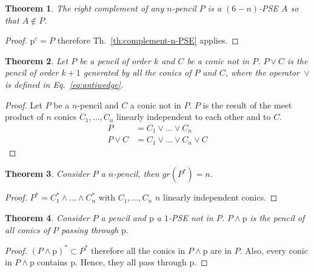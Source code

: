 \documentclass{birkjour}
\newtheorem{theorem}{Theorem}
\begin{document}
\begin{theorem}
The right complement of any \(n\)-pencil \(P\) is a \((6-n)\)-PSE \(A\) so that \(A \notin P\).
\end{theorem}
\begin{proof}
\(\mathrm{p}^c = P\) therefore Th.~\ref{th:complement-n-PSE} applies.
\end{proof}


\begin{theorem} \label{th:constraint-add-conic}
Let \(P\) be a pencil of order \(k\) and \(C\) be a conic not in \(P\).
    \(P\vee C\) is the pencil of order $k+1$ generated by all the conics of \(P\) and \(C\), where the operator~$\vee$ is defined in Eq.~\eqref{eq:antiwedge}.
\end{theorem}


\begin{proof}
Let \(P\) be a \(n\)-pencil and \(C\) a conic not in \(P\). 
\(P\) is the result of the meet product of \(n\) conics \(C_1, \dots, C_n\) linearly independent to each other and to \(C\).
     \begin{align}
     P &= C_1 \vee \dots \vee C_n \\
     P \vee C &= C_1 \vee \dots \vee C_n \vee C
     \end{align}
\end{proof}

\begin{theorem}
    Consider \(P\) a \(n\)-pencil, then \(gr(P^*) = n\).
\end{theorem}
\begin{proof} 
    \(P^* = C_1^* \wedge \dots \wedge C_n^*\) with \(C_1, \dots, C_n\) $n$ linearly independent conics.
\end{proof}


\begin{theorem}\label{th:constraint-add-point}
    Consider \(P\) a pencil and \(\mathrm{p}\) a \(1\)-PSE not in \(P\).
    \(P\wedge \mathrm{p}\) is the pencil of all conics of \(P\) passing through \(\mathrm{p}\).
\end{theorem}
\begin{proof}
\((P \wedge \mathrm{p})^* \subset P^*\) therefore all the conics in \(P\wedge \mathrm{p}\) are in \(P\).
Also, every conic in \(P \wedge \mathrm{p}\) contains \(\mathrm{p}\). Hence, they all pass through p.
\end{proof}
\end{document}
